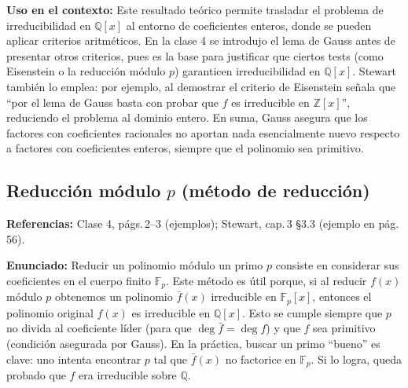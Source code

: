 \documentclass[12pt, letter]{article}
\begin{document}
\textbf{Uso en el contexto:}  
Este resultado teórico permite trasladar el problema de irreducibilidad en $\mathbb{Q}[x]$ al entorno de coeficientes enteros, donde se pueden aplicar criterios aritméticos.  
En la clase 4 se introdujo el lema de Gauss antes de presentar otros criterios, pues es la base para justificar que ciertos tests (como Eisenstein o la reducción módulo $p$) garanticen irreducibilidad en $\mathbb{Q}[x]$.  
Stewart también lo emplea: por ejemplo, al demostrar el criterio de Eisenstein señala que “por el lema de Gauss basta con probar que $f$ es irreducible en $\mathbb{Z}[x]$”, reduciendo el problema al dominio entero.  
En suma, Gauss asegura que los factores con coeficientes racionales no aportan nada esencialmente nuevo respecto a factores con coeficientes enteros, siempre que el polinomio sea primitivo.

\subsection*{Reducción módulo $p$ (método de reducción)}

\textbf{Referencias:} Clase 4, págs.\,2–3 (ejemplos); Stewart, cap.\,3 §3.3 (ejemplo en pág.\,56).

\textbf{Enunciado:}  
Reducir un polinomio módulo un primo $p$ consiste en considerar sus coeficientes en el cuerpo finito $\mathbb{F}_p$.  
Este método es útil porque, si al reducir $f(x)$ módulo $p$ obtenemos un polinomio $\bar{f}(x)$ irreducible en $\mathbb{F}_p[x]$, entonces el polinomio original $f(x)$ es irreducible en $\mathbb{Q}[x]$.  
Esto se cumple siempre que $p$ no divida al coeficiente líder (para que $\deg\bar f=\deg f$) y que $f$ sea primitivo (condición asegurada por Gauss).  
En la práctica, buscar un primo “bueno” es clave: uno intenta encontrar $p$ tal que $\bar f(x)$ no factorice en $\mathbb{F}_p$.  
Si lo logra, queda probado que $f$ era irreducible sobre $\mathbb{Q}$.
\end{document}
